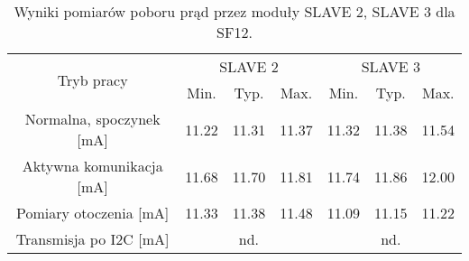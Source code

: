 \begin{table}[!htbp]
    \ContinuedFloat
    \centering
    \caption{\label{tab:power-usage-sf12b}Wyniki pomiarów poboru prąd przez moduły SLAVE 2, SLAVE 3 dla SF12.}
    \begin{tabular}{ccccccc}
        \toprule
        \multicolumn{1}{c}{\multirow{2}[4]{*}{Tryb pracy}} & \multicolumn{3}{c}{SLAVE 2} & \multicolumn{3}{c}{SLAVE 3}                                                                                                             \\
        \cmidrule{2-7}                                     & \multicolumn{1}{c}{Min.}    & \multicolumn{1}{c}{Typ.}    & \multicolumn{1}{c}{Max.} & \multicolumn{1}{c}{Min.} & \multicolumn{1}{c}{Typ.} & \multicolumn{1}{c}{Max.} \\
        \midrule
        Normalna, spoczynek [mA]                           & 11.22                       & 11.31                       & 11.37                    & 11.32                    & 11.38                    & 11.54                    \\
        \midrule
        Aktywna komunikacja [mA]                           & 11.68                       & 11.70                       & 11.81                    & 11.74                    & 11.86                    & 12.00                    \\
        \midrule
        Pomiary otoczenia [mA]                             & 11.33                       & 11.38                       & 11.48                    & 11.09                    & 11.15                    & 11.22                    \\
        \midrule
        Transmisja po I2C [mA]                             & \multicolumn{3}{c}{nd.}     & \multicolumn{3}{c}{nd.}                                                                                                                 \\
        \bottomrule
    \end{tabular}%
\end{table}